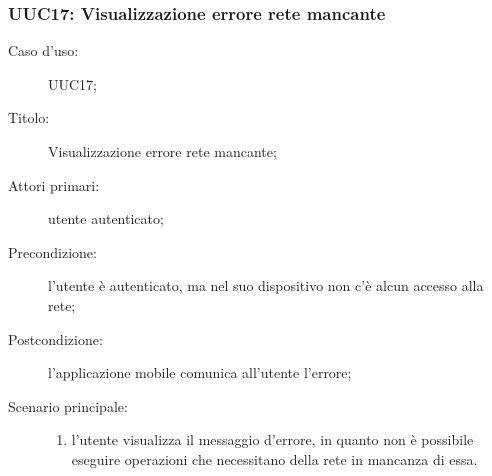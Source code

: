 \documentclass[../../../analisi-dei-requisiti.tex]{subfiles}
\begin{document}
\subsubsection{UUC17: Visualizzazione errore rete mancante}%
\label{subs:UUC17}

\begin{description}
  \item[Caso d'uso:] UUC17;
  \item[Titolo:] Visualizzazione errore rete mancante;
  \item[Attori primari:] utente autenticato;
  \item[Precondizione:] l'utente è autenticato, ma nel suo dispositivo non c'è alcun accesso alla rete;
  \item[Postcondizione:] l'applicazione mobile comunica all'utente l'errore;
  \item[Scenario principale:]
        \begin{enumerate}
          \item l'utente visualizza il messaggio d'errore, in quanto non è possibile eseguire operazioni che necessitano della rete in mancanza di essa.
        \end{enumerate}
\end{description}
\end{document}
